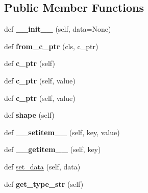 \subsection*{Public Member Functions}
\begin{DoxyCompactItemize}
\item 
def {\bfseries \+\_\+\+\_\+init\+\_\+\+\_\+} (self, data=None)\hypertarget{classpyhdc_1_1_h_d_c_a2cad05f1fdef0f40c5bafacfd8345404}{}\label{classpyhdc_1_1_h_d_c_a2cad05f1fdef0f40c5bafacfd8345404}

\item 
def {\bfseries from\+\_\+c\+\_\+ptr} (cls, c\+\_\+ptr)\hypertarget{classpyhdc_1_1_h_d_c_adac78b1be622ccda340ff3d2bada6c80}{}\label{classpyhdc_1_1_h_d_c_adac78b1be622ccda340ff3d2bada6c80}

\item 
def {\bfseries c\+\_\+ptr} (self)\hypertarget{classpyhdc_1_1_h_d_c_a850482baa4f0fbb70d64d00ddb106d0b}{}\label{classpyhdc_1_1_h_d_c_a850482baa4f0fbb70d64d00ddb106d0b}

\item 
def {\bfseries c\+\_\+ptr} (self, value)\hypertarget{classpyhdc_1_1_h_d_c_a12837a146c289d28a0e3afb831fe095a}{}\label{classpyhdc_1_1_h_d_c_a12837a146c289d28a0e3afb831fe095a}

\item 
def {\bfseries c\+\_\+ptr} (self, value)\hypertarget{classpyhdc_1_1_h_d_c_a12837a146c289d28a0e3afb831fe095a}{}\label{classpyhdc_1_1_h_d_c_a12837a146c289d28a0e3afb831fe095a}

\item 
def {\bfseries shape} (self)\hypertarget{classpyhdc_1_1_h_d_c_a57ffc01d476e783c0f3cdc6e34b2acf5}{}\label{classpyhdc_1_1_h_d_c_a57ffc01d476e783c0f3cdc6e34b2acf5}

\item 
def {\bfseries \+\_\+\+\_\+setitem\+\_\+\+\_\+} (self, key, value)\hypertarget{classpyhdc_1_1_h_d_c_a50c2a3bcb7e6ed02394db3bcedbb90bd}{}\label{classpyhdc_1_1_h_d_c_a50c2a3bcb7e6ed02394db3bcedbb90bd}

\item 
def {\bfseries \+\_\+\+\_\+getitem\+\_\+\+\_\+} (self, key)\hypertarget{classpyhdc_1_1_h_d_c_a18c755c410c192bc9f944f54d03efcad}{}\label{classpyhdc_1_1_h_d_c_a18c755c410c192bc9f944f54d03efcad}

\item 
def \hyperlink{classpyhdc_1_1_h_d_c_a42b5d61d63e3ff6c9a0824eeaa5af88d}{set\+\_\+data} (self, data)
\item 
def {\bfseries get\+\_\+type\+\_\+str} (self)\hypertarget{classpyhdc_1_1_h_d_c_a713e9156f96be1d70589536fe8466980}{}\label{classpyhdc_1_1_h_d_c_a713e9156f96be1d70589536fe8466980}


\end{DoxyCompactItemize}
